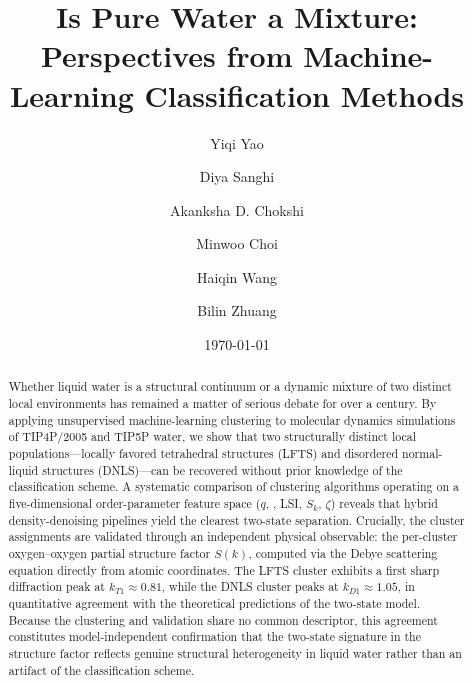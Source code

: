 \documentclass[aps, amsmath,amssymb, reprint, twocolumn,notitlepage,superscriptaddress]{revtex4-2}
\begin{document}
\title{Is Pure Water a Mixture: Perspectives from Machine-Learning Classification Methods}
\author{Yiqi Yao}
\author{Diya Sanghi}
\author{Akanksha D. Chokshi}
\author{Minwoo Choi}
\author{Haiqin Wang}
\author{Bilin Zhuang}
\date{\today}

\begin{abstract}
Whether liquid water is a structural continuum or a dynamic mixture of two distinct local environments has remained a matter of serious debate for over a century. By applying unsupervised machine-learning clustering to molecular dynamics simulations of TIP4P/2005 and TIP5P water, we show that two structurally distinct local populations---locally favored tetrahedral structures (LFTS) and disordered normal-liquid structures (DNLS)---can be recovered without prior knowledge of the classification scheme. A systematic comparison of clustering algorithms operating on a five-dimensional order-parameter feature space ($q$, , LSI, $S_k$, $\zeta$) reveals that hybrid density-denoising pipelines yield the clearest two-state separation. Crucially, the cluster assignments are validated through an independent physical observable: the per-cluster oxygen--oxygen partial structure factor $S(k)$, computed via the Debye scattering equation directly from atomic coordinates. The LFTS cluster exhibits a first sharp diffraction peak at $k_{T1}\approx 0.81$, while the DNLS cluster peaks at $k_{D1} \approx 1.05$, in quantitative agreement with the theoretical predictions of the two-state model. Because the clustering and validation share no common descriptor, this agreement constitutes model-independent confirmation that the two-state signature in the structure factor reflects genuine structural heterogeneity in liquid water rather than an artifact of the classification scheme.
\end{abstract}

\maketitle
\end{document}
